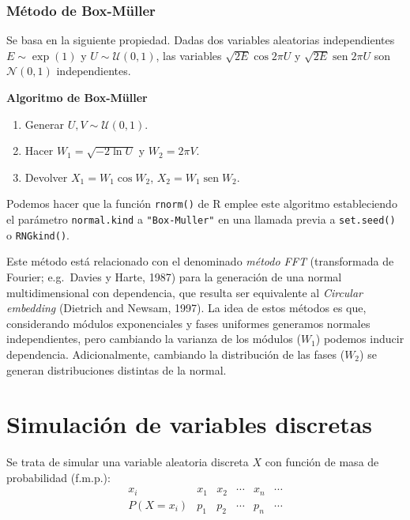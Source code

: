 \documentclass[
]{book}
\theoremstyle{break}
\theoremstyle{definition}
\theoremstyle{definition}
\theoremstyle{definition}
\theoremstyle{remark}
\begin{document}
\hypertarget{muxe9todo-de-box-muxfcller}{%
\subsection{Método de Box-Müller}\label{muxe9todo-de-box-muxfcller}}

Se basa en la siguiente propiedad. Dadas dos variables aleatorias independientes \(E \sim \exp\left( 1\right)\) y
\(U \sim \mathcal{U}( 0, 1 )\), las variables
\(\sqrt{2E} \cos 2\pi U\) y \(\sqrt{2E}\operatorname{sen} 2\pi U\) son
\(\mathcal{N}( 0, 1 )\) independientes.

\textbf{Algoritmo de Box-Müller}

\begin{enumerate}
\def\labelenumi{\arabic{enumi}.}
\item
  Generar \(U,V\sim \mathcal{U}( 0, 1 )\).
\item
  Hacer \(W_1=\sqrt{-2\ln U}\) y \(W_2=2\pi V\).
\item
  Devolver \(X_1=W_1\cos W_2\), \(X_2=W_1\operatorname{sen}W_2\).
\end{enumerate}

Podemos hacer que la función \texttt{rnorm()} de R emplee este algoritmo estableciendo el parámetro \texttt{normal.kind} a \texttt{"Box-Muller"} en una llamada previa a \texttt{set.seed()} o \texttt{RNGkind()}.

Este método está relacionado con el denominado \emph{método FFT} (transformada de Fourier; e.g.~Davies y Harte, 1987) para la generación de una normal multidimensional con dependencia, que resulta ser equivalente al \emph{Circular embedding} (Dietrich and Newsam, 1997).
La idea de estos métodos es que, considerando módulos exponenciales y fases uniformes generamos normales independientes, pero cambiando la varianza de los módulos (\(W_1\)) podemos inducir dependencia.
Adicionalmente, cambiando la distribución de las fases (\(W_2\)) se generan distribuciones distintas de la normal.

\hypertarget{discretas}{%
\chapter{Simulación de variables discretas}\label{discretas}}

Se trata de simular una variable aleatoria discreta \(X\) con función de masa de
probabilidad (f.m.p.):
\[\begin{array}{l|ccccc}
 x_{i}  &  x_{1}  &  x_{2}  &  \cdots   &  x_{n}  &  \cdots   \\ \hline
 P\left( X=x_{i}\right)   &  p_{1}  &  p_{2}  &  \cdots   &  p_{n}  &  
\cdots  
\end{array}\]
\end{document}
